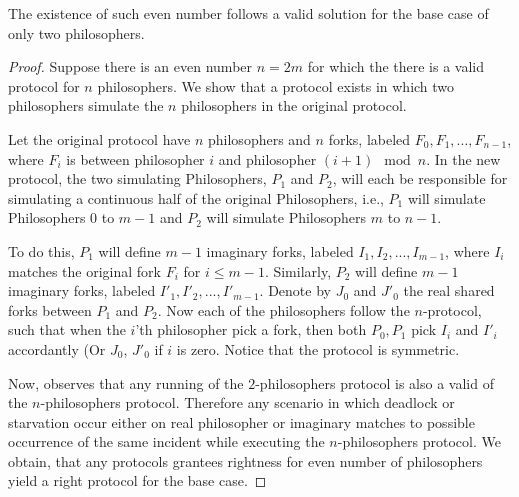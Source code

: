 \documentclass[manuscript,screen,review]{acmart}
\begin{document}
\begin{claim} 
  The existence of such even number follows a valid solution for the base case of only two philosophers.
\end{claim}
\begin{proof}
Suppose there is an even number $n = 2m$ for which the there is a valid protocol for $n$ philosophers. We show that a protocol exists in which two philosophers simulate the $n$ philosophers in the original protocol.

Let the original protocol have $n$ philosophers and $n$ forks, labeled $F_0, F_1, ..., F_{n-1}$, where $F_i$ is between philosopher $i$ and philosopher $(i+1) \mod n$. In the new protocol, the two simulating Philosophers, $P_1$ and $P_2$, will each be responsible for simulating a continuous half of the original Philosophers, i.e., $P_1$ will simulate Philosophers $0$ to $m-1$ and $P_2$ will simulate Philosophers $m$ to $n-1$. 

To do this, $P_1$ will define $m-1$ imaginary forks, labeled $I_1, I_2, ..., I_{m-1}$, where $I_i$ matches the original fork $F_{i}$ for $i\le m-1$. Similarly, $P_2$ will define $m-1$ imaginary forks, labeled $I'_1, I'_2, ..., I'_{m-1}$. Denote by $J_{0}$ and $J'_{0}$ the real shared forks between $P_{1}$ and $P_{2}$. Now each of the philosophers follow the $n$-protocol, such that when the $i$'th philosopher pick a fork, then both $P_{0}, P_{1}$ pick $I_{i}$ and $I'_{i}$ accordantly (Or $J_{0}$, $J'_{0}$ if $i$ is zero. Notice that the protocol is symmetric. 

  Now, observes that any running of the $2$-philosophers protocol is also a valid of the $n$-philosophers protocol. Therefore any scenario in which deadlock or starvation occur either on real philosopher or imaginary matches to possible occurrence of the same incident while executing the $n$-philosophers protocol.  We obtain, that any protocols grantees rightness for even number of philosophers yield a right protocol for the base case.

\end{proof}




% 
\printbibliography
\end{document}
